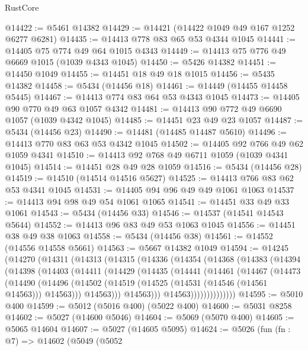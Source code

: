\begin{lexlean}{RustCore}
\begin{coremodule}
@14422 := @5461 @14382
@14429 := @14421 (@14422 @1049 @49 @167 @1252 @6277 @6281)
@14435 := @14413 @778 @83 @65 @53 @4344 @1045
@14441 := @14405 @75 @774 @49 @64 @1015 @4343
@14449 := @14413 @75 @776 @49 @6669 @1015 (@1039 @4343 @1045)
@14450 := @5426 @14382
@14451 := @14450 @1049
@14455 := @14451 @18 @49 @18 @1015
@14456 := @5435 @14382
@14458 := @5434 (@14456 @18)
@14461 := @14449 (@14455 @14458 @5445)
@14467 := @14413 @774 @83 @64 @53 @4343 @1045
@14473 := @14405 @90 @770 @49 @63 @1057 @4342
@14481 := @14413 @90 @772 @49 @6690 @1057 (@1039 @4342 @1045)
@14485 := @14451 @23 @49 @23 @1057
@14487 := @5434 (@14456 @23)
@14490 := @14481 (@14485 @14487 @5610)
@14496 := @14413 @770 @83 @63 @53 @4342 @1045
@14502 := @14405 @92 @766 @49 @62 @1059 @4341
@14510 := @14413 @92 @768 @49 @6711 @1059 (@1039 @4341 @1045)
@14514 := @14451 @28 @49 @28 @1059
@14516 := @5434 (@14456 @28)
@14519 := @14510 (@14514 @14516 @5627)
@14525 := @14413 @766 @83 @62 @53 @4341 @1045
@14531 := @14405 @94 @96 @49 @49 @1061 @1063
@14537 := @14413 @94 @98 @49 @54 @1061 @1065
@14541 := @14451 @33 @49 @33 @1061
@14543 := @5434 (@14456 @33)
@14546 := @14537 (@14541 @14543 @5644)
@14552 := @14413 @96 @83 @49 @53 @1063 @1045
@14556 := @14451 @38 @49 @38 @1063
@14558 := @5434 (@14456 @38)
@14561 := @14552 (@14556 @14558 @5661)
@14563 := @5667 @14382 @1049
@14594 := @14245
    (@14270
      (@14311
        (@14313
          (@14315
            (@14336
              (@14354
                (@14368
                  (@14383
                    (@14394
                      (@14398
                        (@14403
                          (@14411
                            (@14429
                              (@14435
                                (@14441
                                  (@14461
                                    (@14467
                                      (@14473
                                        (@14490
                                          (@14496
                                            (@14502
                                              (@14519
                                                (@14525 (@14531 (@14546 (@14561 @14563))) @14563)))
                                            @14563)))
                                      @14563)))
                                @14563))))))))))))))
@14595 := @5010 @400
@14599 := @5012 (@5016 @400) (@5022 @400)
@14600 := @5031 @8258
@14602 := @5027 (@14600 @5046)
@14604 := @5069 (@5070 @400)
@14605 := @5065 @14604
@14607 := @5027 (@14605 @5095)
@14624 := @5026
    (fun (fn : @7) =>
    @14602
      (@5049
        (@5052

\end{coremodule}
\end{lexlean}
